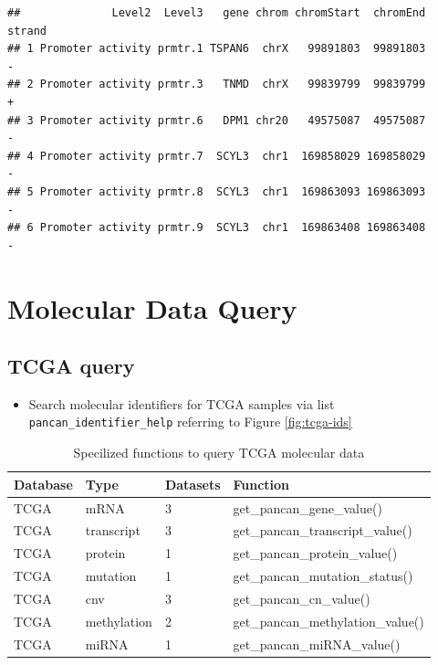 \documentclass[
]{book}
\providecommand{\tightlist}{%
  \setlength{\itemsep}{0pt}\setlength{\parskip}{0pt}}
\begin{document}
\begin{verbatim}
##              Level2  Level3   gene chrom chromStart  chromEnd strand
## 1 Promoter activity prmtr.1 TSPAN6  chrX   99891803  99891803      -
## 2 Promoter activity prmtr.3   TNMD  chrX   99839799  99839799      +
## 3 Promoter activity prmtr.6   DPM1 chr20   49575087  49575087      -
## 4 Promoter activity prmtr.7  SCYL3  chr1  169858029 169858029      -
## 5 Promoter activity prmtr.8  SCYL3  chr1  169863093 169863093      -
## 6 Promoter activity prmtr.9  SCYL3  chr1  169863408 169863408      -
\end{verbatim}

\chapter{Molecular Data Query}\label{data-query}

\section{TCGA query}\label{tcga-query}

\begin{itemize}
\tightlist
\item
  Search molecular identifiers for TCGA samples via list \texttt{pancan\_identifier\_help} referring to Figure \ref{fig:tcga-ids}
\end{itemize}

\begin{table}

\caption{\label{tab:query-tcga-func}Specilized functions to query TCGA molecular data}
\centering
\begin{tabular}[t]{llll}
\toprule
Database & Type & Datasets & Function\\
\midrule
TCGA & mRNA & 3 & get\_pancan\_gene\_value()\\
TCGA & transcript & 3 & get\_pancan\_transcript\_value()\\
TCGA & protein & 1 & get\_pancan\_protein\_value()\\
TCGA & mutation & 1 & get\_pancan\_mutation\_status()\\
TCGA & cnv & 3 & get\_pancan\_cn\_value()\\
\addlinespace
TCGA & methylation & 2 & get\_pancan\_methylation\_value()\\
TCGA & miRNA & 1 & get\_pancan\_miRNA\_value()\\
\bottomrule
\end{tabular}
\end{table}
\end{document}

